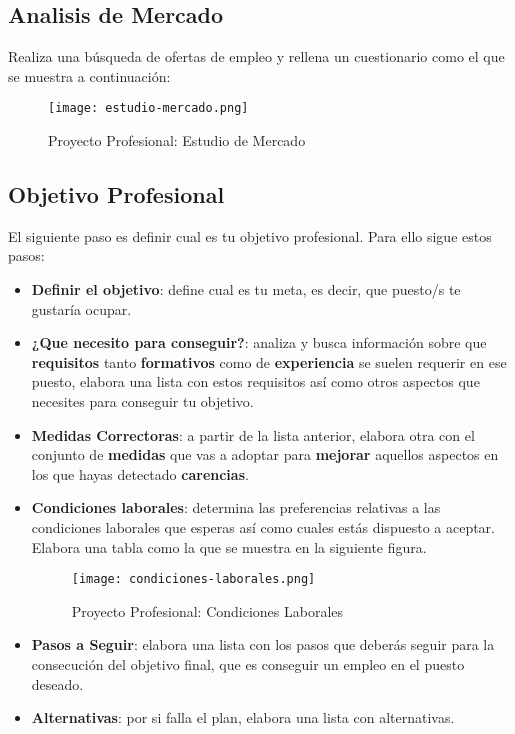 \subsection{Analisis de Mercado}
Realiza una búsqueda de ofertas de empleo y rellena un cuestionario como el que se muestra a continuación:

\begin{figure}[ht]
    \centering
    \texttt{[image: estudio-mercado.png]}
    \caption{Proyecto Profesional: Estudio de Mercado}
\end{figure}

\subsection{Objetivo Profesional}
El siguiente paso es definir cual es tu objetivo profesional. Para ello sigue estos pasos:

\begin{itemize}
    \item \textbf{Definir el objetivo}: define cual es tu meta, es decir, que puesto/s te gustaría ocupar.

    \item \textbf{¿Que necesito para conseguir?}: analiza y busca información sobre que \textbf{requisitos} tanto \textbf{formativos} como de \textbf{experiencia} se suelen requerir en ese puesto, elabora una lista con estos requisitos así como otros aspectos que necesites para conseguir tu objetivo.

    \item \textbf{Medidas Correctoras}: a partir de la lista anterior, elabora otra con el conjunto de \textbf{medidas} que vas a adoptar para \textbf{mejorar} aquellos aspectos en los que hayas detectado \textbf{carencias}.

    \item \textbf{Condiciones laborales}: determina las preferencias relativas a las condiciones laborales que esperas así como cuales estás dispuesto a aceptar. Elabora una tabla como la que se muestra en la siguiente figura.
    \begin{figure}[ht]
        \centering
        \texttt{[image: condiciones-laborales.png]}
        \caption{Proyecto Profesional: Condiciones Laborales}
    \end{figure}

    \item \textbf{Pasos a Seguir}: elabora una lista con los pasos que deberás seguir para la consecución del objetivo final, que es conseguir un empleo en el puesto deseado.

    \item \textbf{Alternativas}: por si falla el plan, elabora una lista con alternativas.
\end{itemize}

